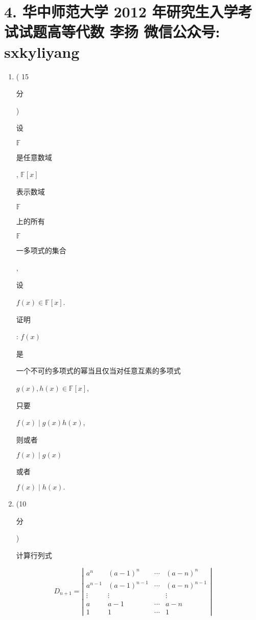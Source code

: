 \documentclass[10pt]{article}
\begin{document}
\section{4. 华中师范大学 2012 年研究生入学考试试题高等代数 
 李扬 
 微信公众号: sxkyliyang}
\begin{enumerate}
  \item ( 15 \begin{CJK}{UTF8}{mj}分\end{CJK}) \begin{CJK}{UTF8}{mj}设\end{CJK} $\mathbb{F}$ \begin{CJK}{UTF8}{mj}是任意数域\end{CJK}, $\mathbb{F}[x]$ \begin{CJK}{UTF8}{mj}表示数域\end{CJK} $\mathbb{F}$ \begin{CJK}{UTF8}{mj}上的所有\end{CJK} $\mathbb{F}$ \begin{CJK}{UTF8}{mj}一多项式的集合\end{CJK}, \begin{CJK}{UTF8}{mj}设\end{CJK} $f(x) \in \mathbb{F}[x]$. \begin{CJK}{UTF8}{mj}证明\end{CJK}: $f(x)$ \begin{CJK}{UTF8}{mj}是\end{CJK} \begin{CJK}{UTF8}{mj}一个不可约多项式的幂当且仅当对任意互素的多项式\end{CJK} $g(x), h(x) \in \mathbb{F}[x]$, \begin{CJK}{UTF8}{mj}只要\end{CJK} $f(x) \mid g(x) h(x)$, \begin{CJK}{UTF8}{mj}则或者\end{CJK} $f(x) \mid g(x)$ \begin{CJK}{UTF8}{mj}或者\end{CJK} $f(x) \mid h(x) .$

  \item (10 \begin{CJK}{UTF8}{mj}分\end{CJK}) \begin{CJK}{UTF8}{mj}计算行列式\end{CJK}

\end{enumerate}
$$
D_{n+1}=\left|\begin{array}{cccc}
a^{n} & (a-1)^{n} & \cdots & (a-n)^{n} \\
a^{n-1} & (a-1)^{n-1} & \cdots & (a-n)^{n-1} \\
\vdots & \vdots & & \vdots \\
a & a-1 & \cdots & a-n \\
1 & 1 & \cdots & 1
\end{array}\right|
$$
\end{document}
